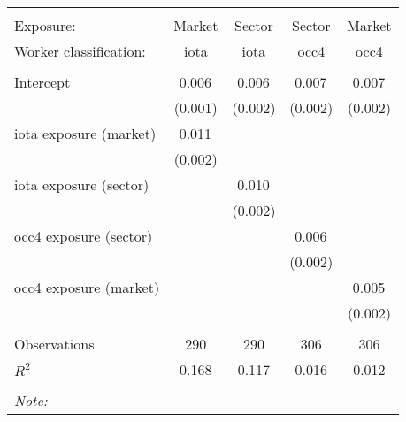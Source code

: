 \begin{tabular}{@{\extracolsep{5pt}}lcccc}
\\[-1.8ex]\hline
\hline \\[-1.8ex]
\hline \\[-1.8ex]
 Exposure: & Market & Sector & Sector & Market \\
 Worker classification: & iota & iota & occ4 & occ4 \\
 \hline &  &  &  &  \\
 Intercept & 0.006$^{}$ & 0.006$^{}$ & 0.007$^{}$ & 0.007$^{}$ \\
  & (0.001) & (0.002) & (0.002) & (0.002) \\
 iota exposure (market) & 0.011$^{}$ & & & \\
  & (0.002) & & & \\
 iota exposure (sector) & & 0.010$^{}$ & & \\
  & & (0.002) & & \\
 occ4 exposure (sector) & & & 0.006$^{}$ & \\
  & & & (0.002) & \\
 occ4 exposure (market) & & & & 0.005$^{}$ \\
  & & & & (0.002) \\
\hline \\[-1.8ex]
 Observations & 290 & 290 & 306 & 306 \\
 $R^2$ & 0.168 & 0.117 & 0.016 & 0.012 \\
\hline
\hline \\[-1.8ex]
\textit{Note:}\end{tabular}